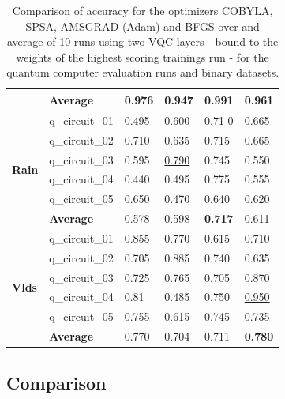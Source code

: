 \begin{table}[!h]
\begin{tabular}{p{}p{}|p{}p{}p{}p{}}
		\cline{2-6} 
		                        & \textbf{Average} & 0.976  & 0.947 & \textbf{0.991}    & 0.961 \\
		\hline 
		\multirow{6}{*}{\textbf{Rain}}   & q\_circuit\_01 & 0.495  & 0.600 & 0.71 0  & 0.665 \\
		                        & q\_circuit\_02 & 0.710  & 0.635 & 0.715    & 0.665 \\
		                        & q\_circuit\_03 & 0.595  & \underline{0.790} & 0.745    & 0.550 \\
		                        & q\_circuit\_04 & 0.440  & 0.495 & 0.775    & 0.555 \\
		                        & q\_circuit\_05 & 0.650  & 0.470 & 0.640   & 0.620 \\
		\cline{2-6} 
		                        & \textbf{Average} & 0.578  & 0.598 & \textbf{0.717}    & 0.611 \\
		\hline 
		\multirow{6}{*}{\textbf{Vlds}}   & q\_circuit\_01 & 0.855  & 0.770 & 0.615    & 0.710 \\
		                        & q\_circuit\_02 & 0.705  & 0.885 & 0.740    & 0.635 \\
		                        & q\_circuit\_03 & 0.725  & 0.765 & 0.705    & 0.870 \\
		                        & q\_circuit\_04 & 0.81  & 0.485 & 0.750    & \underline{0.950} \\
		                        & q\_circuit\_05 & 0.755  & 0.615 & 0.745    & 0.735 \\
		\cline{2-6} 
		                        & \textbf{Average} & 0.770  & 0.704 & 0.711    & \textbf{0.780} \\
		\hline
	\end{tabular}
	\caption{Comparison of accuracy for the optimizers COBYLA, SPSA, AMSGRAD (Adam) and BFGS over and average of 10 runs using two VQC layers - bound to the weights of the highest scoring trainings run - for the quantum computer evaluation runs and binary datasets.}
	\label{table:accuracy_comparison_binary_dataset_and_optimizers_evaluation_runs}
\end{table}

\subsection{Comparison}



